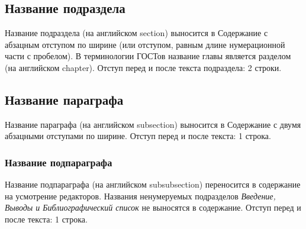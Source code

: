 \begin{refsection}
	
	
	
	\section{Название подраздела} \label{sect1_3} %
	
	
	
	Название подраздела (на английском section) выносится в Содержание с абзацным отступом по ширине (или отступом, равным длине нумерационной части с пробелом). В терминологии ГОСТов название главы является разделом (на английском chapter). Отступ перед и после текста подраздела: 2 строки.
	
	

	
	\subsection{Название параграфа} \label{sect1_3_1} %
	
	
	Название параграфа (на английском subsection)  выносится в Содержание с двумя абзацными отступами по ширине. Отступ перед и после текста: 1 строка. 
	
	
		
	\subsubsection{Название подпараграфа} \label{sect1_3_1_1} %
	
	
	
	
	Название подпараграфа (на английском subsubsection) переносится в содержание на усмотрение редакторов. Названия ненумеруемых подразделов {\itshape Введение, Выводы и Библиографический список} не выносятся в содержание.  Отступ перед и после текста: 1 строка.
	

\end{refsection}
